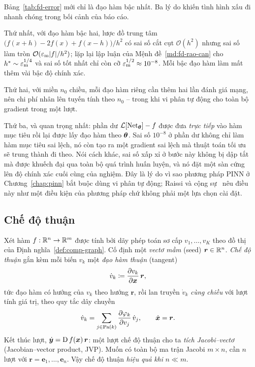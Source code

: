 \begin{nhanxet}
\label{nx:fd-pde}
Bảng~\ref{tab:fd-error} mới chỉ là đạo hàm bậc nhất. Ba lý do khiến tình hình xấu
đi nhanh chóng trong bối cảnh của báo cáo.
 
Thứ nhất, với đạo hàm bậc hai, lược đồ trung tâm
$\big(f(x+h)-2f(x)+f(x-h)\big)/h^2$ có sai số cắt cụt $\mathcal{O}(h^2)$ nhưng
sai số làm tròn $\mathcal{O}(\varepsilon_{\mathrm{m}}|f|/h^2)$; lặp lại lập luận của
Mệnh đề~\ref{md:fd-rao-can} cho $h^{*} \sim \varepsilon_{\mathrm{m}}^{1/4}$ và sai số tốt nhất chỉ
còn cỡ $\varepsilon_{\mathrm{m}}^{1/2} \approx 10^{-8}$. Mỗi bậc đạo hàm làm mất thêm vài bậc độ
chính xác.
 
Thứ hai, với miền $n_0$ chiều, mỗi đạo hàm riêng cần thêm hai lần đánh giá mạng,
nên chi phí nhân lên tuyến tính theo $n_0$ -- trong khi vi phân tự động cho toàn
bộ gradient trong một lượt.
 
Thứ ba, và quan trọng nhất: phần dư $\mathcal{L}[\operatorname{Net}_{\bm{\theta}}] - f$ được đưa
\emph{trực tiếp} vào hàm mục tiêu rồi lại được lấy đạo hàm theo $\bm{\theta}$. Sai số
$10^{-8}$ ở phần dư không chỉ làm hàm mục tiêu sai lệch, nó còn tạo ra một
gradient sai lệch mà thuật toán tối ưu sẽ trung thành đi theo. Nói cách khác, sai
số xấp xỉ ở bước này không bị dập tắt mà được khuếch đại qua toàn bộ quá trình
huấn luyện, và nó đặt một sàn cứng lên độ chính xác cuối cùng của nghiệm. Đây là
lý do vì sao phương pháp PINN ở Chương~\ref{chap:pinn} bắt buộc dùng vi phân tự
động; Raissi và cộng sự~\cite{raissi2019} nêu điều này như một điều kiện của
phương pháp chứ không phải một lựa chọn cài đặt.
\end{nhanxet}
 
\subsection{Chế độ thuận}
\label{subsec:forward-mode}
 
Xét hàm $f : \mathbb{R}^n \to \mathbb{R}^m$ được tính bởi dãy phép toán sơ cấp $v_1,\dots,v_K$
theo đồ thị của Định nghĩa~\ref{def:comp-graph}. Cố định một \emph{vectơ mầm}
(seed) $\bm{r} \in \mathbb{R}^n$. \emph{Chế độ thuận} gắn kèm mỗi biến $v_k$ một
\emph{đạo hàm thuận} (tangent)
\begin{equation}
\dot{v}_k \coloneqq \frac{\partial v_k}{\partial \bm{x}}\, \bm{r},
\label{eq:tangent}
\end{equation}
tức đạo hàm có hướng của $v_k$ theo hướng $\bm{r}$, rồi lan truyền $\dot{v}_k$
\emph{cùng chiều} với lượt tính giá trị, theo quy tắc dây chuyền
\begin{equation}
\dot{v}_k = \sum_{j \in \mathrm{Pa}(k)}
  \frac{\partial \varphi_k}{\partial v_j}\, \dot{v}_j ,
\qquad
\dot{\bm{x}} = \bm{r}.
\label{eq:forward-truy-hoi}
\end{equation}
Kết thúc lượt, $\dot{\bm{y}} = \operatorname{D} f(\bm{x})\,\bm{r}$: một lượt chế độ thuận cho ta
\emph{tích Jacobi--vectơ} (Jacobian--vector product, JVP). Muốn có toàn bộ ma
trận Jacobi $m\times n$, cần $n$ lượt với $\bm{r} = \bm{e}_1,\dots,\bm{e}_n$. Vậy
chế độ thuận \emph{hiệu quả khi $n \ll m$}.
 
